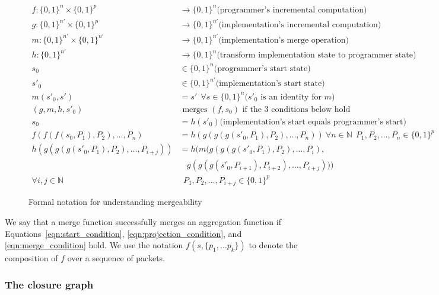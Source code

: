 \begin{figure}[!t]
\begin{align}
f : \{0, 1\}^n \times \{0, 1\}^p & \rightarrow \{0, 1\}^n \mbox{(programmer's incremental computation)} \nonumber \\
g : \{0, 1\}^{n'} \times \{0, 1\}^p  & \rightarrow \{0, 1\}^{n'} \mbox{(implementation's incremental computation)} \nonumber \\
m : \{0, 1\}^{n'} \times \{0, 1\}^{n'} & \rightarrow \{0, 1\}^{n'} \mbox{(implementation's merge operation)} \nonumber \\
h : \{0, 1\}^{n'}               & \rightarrow \{0, 1\}^n  \mbox{(transform
 implementation state to programmer state)} \nonumber \\
s_0  & \in \{0, 1\}^n \mbox{(programmer's start state)} \nonumber \\
s'_0 & \in \{0, 1\}^{n'} \mbox{(implementation's start state)} \nonumber \\
m(s'_0, s') & = s' \ \ \forall s \in \{0, 1\}^{n} \mbox{($s'_0$ is an identity for $m$)} \nonumber \\
(g, m, h, s'_0) & \mbox { merges } (f, s_0) \mbox{ if the 3 conditions below hold } \nonumber \\
s_0 & = h(s'_0) \mbox{(implementation's start equals programmer's start)} \label{eqn:start_condition} \\
f(f(f(s_0, P_1), P_2), \dots, P_n) & = h(g(g(g(s'_0, P_1), P_2), \dots, P_n)) \ \forall n \in \mathbb{N} \ \ P_1, P_2, \dots, P_n \in \{0, 1\}^p \label{eqn:projection_condition} \\
h(g(g(g(s'_0, P_1), P_2), \dots, P_{i+j})) & =h( m(g(g(g(s'_0, P_1), P_2), \dots, P_{i}), \nonumber \\
&\ \ \ \ g(g(g(s'_0, P_{i+1}), P_{i+2}), \dots, P_{i+j}))) \nonumber \\
\forall i, j \in \mathbb{N} & \ \  P_1, P_2, \dots, P_{i+j} \in \{0, 1\}^p \label{eqn:merge_condition}
\end{align}
\caption{Formal notation for understanding mergeability}
\label{fig:formal}
\end{figure}

We say that a merge function successfully merges an aggregation function if
Equations~\ref{eqn:start_condition}, \ref{eqn:projection_condition}, and
\ref{eqn:merge_condition} hold. We use the notation $f(s, \{p_1, \ldots p_k\})$
to denote the composition of $f$ over a sequence of packets. 

\subsubsection{The closure graph}
\label{ss:closure}

